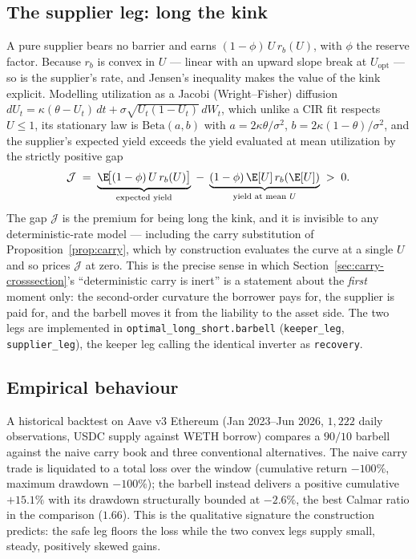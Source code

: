 \subsection{The supplier leg: long the kink}\label{sec:barbell-supplier}
A pure supplier bears no barrier and earns $(1-\phi)\,U\,r_b(U)$, with $\phi$ the reserve factor.
Because $r_b$ is convex in $U$ --- linear with an upward slope break at $U_{\mathrm{opt}}$ --- so is
the supplier's rate, and Jensen's inequality makes the value of the kink explicit. Modelling
utilization as a Jacobi (Wright--Fisher) diffusion
$dU_t=\kappa(\theta-U_t)\,dt+\sigma\sqrt{U_t(1-U_t)}\,dW_t$, which unlike a CIR fit respects
$U\le1$, its stationary law is $\mathrm{Beta}(a,b)$ with $a=2\kappa\theta/\sigma^2$,
$b=2\kappa(1-\theta)/\sigma^2$, and the supplier's expected yield exceeds the yield evaluated at
mean utilization by the strictly positive gap
\begin{equation}\label{eq:jensen}
\mathcal J\;=\;\underbrace{\E\!\big[(1-\phi)\,U\,r_b(U)\big]}_{\text{expected yield}}
\;-\;\underbrace{(1-\phi)\,\E[U]\,r_b(\E[U])}_{\text{yield at mean }U}\;>\;0 .
\end{equation}
The gap $\mathcal J$ is the premium for being long the kink, and it is invisible to any
deterministic-rate model --- including the carry substitution of Proposition~\ref{prop:carry},
which by construction evaluates the curve at a single $U$ and so prices $\mathcal J$ at zero. This is
the precise sense in which Section~\ref{sec:carry-crosssection}'s ``deterministic carry is inert''
is a statement about the \emph{first} moment only: the second-order curvature the borrower pays for,
the supplier is paid for, and the barbell moves it from the liability to the asset side. The two legs
are implemented in \texttt{optimal\_long\_short.barbell} (\texttt{keeper\_leg}, \texttt{supplier\_leg}),
the keeper leg calling the identical inverter as \texttt{recovery}.

\subsection{Empirical behaviour}\label{sec:barbell-empirical}
A historical backtest on Aave v3 Ethereum (Jan 2023--Jun 2026, $1{,}222$ daily observations, USDC
supply against WETH borrow) compares a $90/10$ barbell against the naive carry book and three
conventional alternatives. The naive carry trade is liquidated to a total loss over the window
(cumulative return $-100\%$, maximum drawdown $-100\%$); the barbell instead delivers a positive
cumulative $+15.1\%$ with its drawdown structurally bounded at $-2.6\%$, the best Calmar ratio in the
comparison ($1.66$). This is the qualitative signature the construction predicts: the safe leg floors
the loss while the two convex legs supply small, steady, positively skewed gains.


